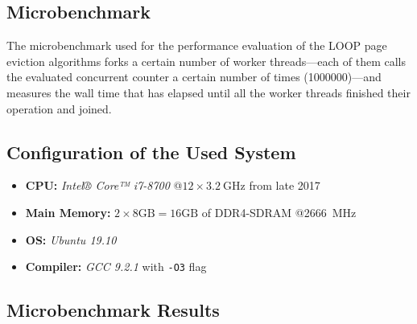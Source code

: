 \subsection[Microbenchmark]{Microbenchmark}

    The microbenchmark used for the performance evaluation of the LOOP page eviction algorithms forks a certain number of worker threads---each of them calls the evaluated concurrent counter a certain number of times (\num{1000000})---and measures the wall time that has elapsed until all the worker threads finished their operation and joined.

\subsection[System Configuration]{Configuration of the Used System}

\begin{@empty}
    \begin{itemize}
        \itemsep0em
		\item	\textbf{CPU:} \emph{Intel® Core™ i7-8700} @$12 \times \SI{3.2}{\giga\hertz}$ from late 2017
        \item	\textbf{Main Memory:} $2 \times 8\text{GB} = 16\text{GB}$ of DDR4-SDRAM @\SI{2666}{\mega\hertz}
        \item	\textbf{OS:} \emph{Ubuntu 19.10}
        \item	\textbf{Compiler: } \emph{GCC 9.2.1} with \texttt{-O3} flag
    \end{itemize}
\end{@empty}

\subsection[Microbenchmark Results]{Microbenchmark Results} \label{subsec:loop-results}

